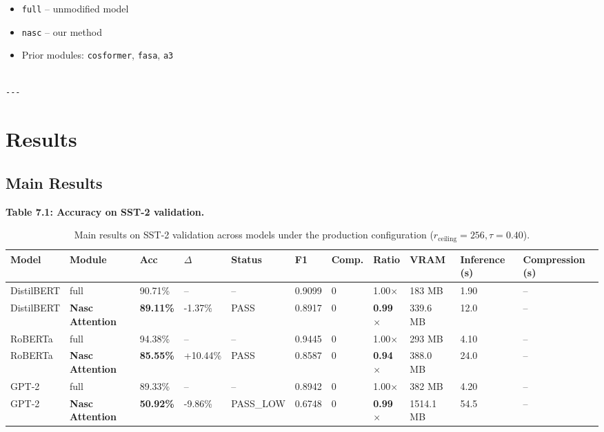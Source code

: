\begin{itemize}
\item \texttt{full} -- unmodified model
\item \texttt{nasc} -- our method
\item Prior modules: \texttt{cosformer}, \texttt{fasa}, \texttt{a3}
\end{itemize}
\begin{lstlisting}

---
\end{lstlisting}


\section{Results}

\subsection{Main Results}

\textbf{Table 7.1: Accuracy on SST-2 validation.}

\begin{table}[t]
\centering
\small
\begin{tabular}{lllllllllll}
\toprule
\textbf{Model} & \textbf{Module} & \textbf{Acc} & \textbf{$\Delta$} & \textbf{Status} & \textbf{F1} & \textbf{Comp.} & \textbf{Ratio} & \textbf{VRAM} & \textbf{Inference (s)} & \textbf{Compression (s)} \\
\midrule
DistilBERT & full & 90.71\% & -- & -- & 0.9099 & 0 & 1.00$\times$ & 183 MB & 1.90 & -- \\
DistilBERT & \textbf{Nasc Attention} & \textbf{89.11\%} & -1.37\% & PASS & 0.8917 & 0 & \textbf{0.99$\times$} & 339.6 MB & 12.0 & -- \\
RoBERTa & full & 94.38\% & -- & -- & 0.9445 & 0 & 1.00$\times$ & 293 MB & 4.10 & -- \\
RoBERTa & \textbf{Nasc Attention} & \textbf{85.55\%} & +10.44\% & PASS & 0.8587 & 0 & \textbf{0.94$\times$} & 388.0 MB & 24.0 & -- \\
GPT-2 & full & 89.33\% & -- & -- & 0.8942 & 0 & 1.00$\times$ & 382 MB & 4.20 & -- \\
GPT-2 & \textbf{Nasc Attention} & \textbf{50.92\%} & -9.86\% & PASS\_LOW & 0.6748 & 0 & \textbf{0.99$\times$} & 1514.1 MB & 54.5 & -- \\
\bottomrule
\end{tabular}
\caption{Main results on SST-2 validation across models under the production configuration ($r_{\mathrm{ceiling}}=256, \tau=0.40$).}
\label{tab:main_sst2}
\end{table}

